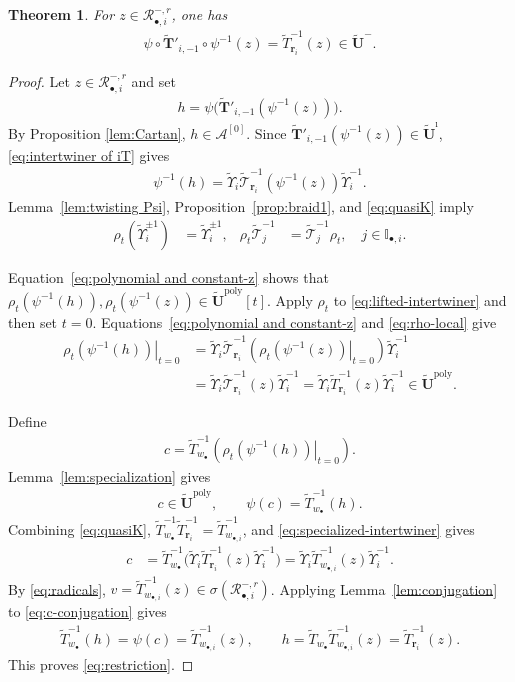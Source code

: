 \documentclass[a4paper,reqno,12pt]{amsart}
\numberwithin{equation}{section}
\newtheorem{theorem}[proposition]{Theorem}
\theoremstyle{definition}
\theoremstyle{plain}
\theoremstyle{definition}
\def\I{\mathbb I}
\def\bIi{\I_{\bullet,i}}
\def\bw{w_\bullet}
\def\bwi{w_{\bullet,i}}
\def\br{\mathbf r}
\def\tU{\widetilde{\mathbf U}}
\def\tUi{\widetilde{\mathbf U}^{\imath}}
\def\tTD{\widetilde T}
\def\tT{\widetilde{\mathscr T}}
\def\tTT{\widetilde{\mathbf T}}
\def\tfX{\widetilde\Upsilon}
\def\cA{\mathcal A}
\def\cR{\mathcal R}
\newcommand{\tTa}[1]{\tTT'_{#1,-1}}
\newcommand{\poly}{\mathrm{poly}}
\begin{document}
\begin{theorem}\label{thm:restriction}
For $z\in\cR_{\bullet,i}^{-,r}$, one has
\begin{align}
\psi\circ\tTa{i}\circ\psi^{-1}(z)=\tTD_{\br_i}^{-1}(z)\in\tU^-.
\label{eq:restriction}
\end{align}
\end{theorem}

\begin{proof}
Let $z\in\cR_{\bullet,i}^{-,r}$ and set
\begin{align}
h=\psi\bigl(\tTa{i}(\psi^{-1}(z))\bigr).
\label{eq:h-definition}
\end{align}
By Proposition \ref{lem:Cartan}, $h\in\cA^{[0]}$.
Since $\tTa{i}(\psi^{-1}(z))\in\tUi$, \eqref{eq:intertwiner of iT} gives
\begin{align}
\psi^{-1}(h)
=\tfX_i\tT_{\br_i}^{-1}(\psi^{-1}(z))\tfX_i^{-1}.
\label{eq:lifted-intertwiner}
\end{align}
Lemma~\ref{lem:twisting Psi}, Proposition~\ref{prop:braid1}, and \eqref{eq:quasiK} imply
\begin{align}
\rho_t(\tfX_i^{\pm1})&=\tfX_i^{\pm1},
&\rho_t\tT_{j}^{-1}&=\tT_{j}^{-1}\rho_t,\quad j\in\bIi.
\label{eq:rho-local}
\end{align}

Equation~\eqref{eq:polynomial and constant-z} shows that $\rho_t(\psi^{-1}(h)),\rho_t(\psi^{-1}(z))\in\tU^\poly[t]$. Apply $\rho_t$ to \eqref{eq:lifted-intertwiner} and then set $t=0$. Equations~\eqref{eq:polynomial and constant-z} and \eqref{eq:rho-local} give
\begin{align}
\left.\rho_t(\psi^{-1}(h))\right|_{t=0}
&=\tfX_i\tT_{\br_i}^{-1}
\left(\left.\rho_t(\psi^{-1}(z))\right|_{t=0}\right)
\tfX_i^{-1}\nonumber\\
&=\tfX_i\tT_{\br_i}^{-1}(z)\tfX_i^{-1}
=\tfX_i\tTD_{\br_i}^{-1}(z)\tfX_i^{-1}\in\tU^\poly.
\label{eq:specialized-intertwiner}
\end{align}

Define
\begin{align*}
c=\tTD_{\bw}^{-1}
\left(\left.\rho_t(\psi^{-1}(h))\right|_{t=0}\right).
\end{align*}
Lemma~\ref{lem:specialization} gives
\begin{align}
c\in\tU^\poly,
\qquad\psi(c)=\tTD_{\bw}^{-1}(h).
\label{eq:c-projection}
\end{align}
Combining \eqref{eq:quasiK}, $\tTD_{\bw}^{-1}\tTD_{\br_i}^{-1}=\tTD_{\bwi}^{-1}$, and \eqref{eq:specialized-intertwiner} gives
\begin{align}
c&=\tTD_{\bw}^{-1}
\bigl(\tfX_i\tTD_{\br_i}^{-1}(z)\tfX_i^{-1}\bigr)=\tfX_i\tTD_{\bwi}^{-1}(z)\tfX_i^{-1}.
\label{eq:c-conjugation}
\end{align}
By \eqref{eq:radicals},
$v=\tTD_{\bwi}^{-1}(z)\in\sigma(\cR_{\bullet,i}^{-,r})$.
Applying Lemma~\ref{lem:conjugation} to \eqref{eq:c-conjugation} gives
\begin{align*}
\tTD_{\bw}^{-1}(h)=\psi(c)=\tTD_{\bwi}^{-1}(z),
\qquad
h=\tTD_{\bw}\tTD_{\bwi}^{-1}(z)=\tTD_{\br_i}^{-1}(z).
\end{align*}
This proves \eqref{eq:restriction}.
\end{proof}
\end{document}
